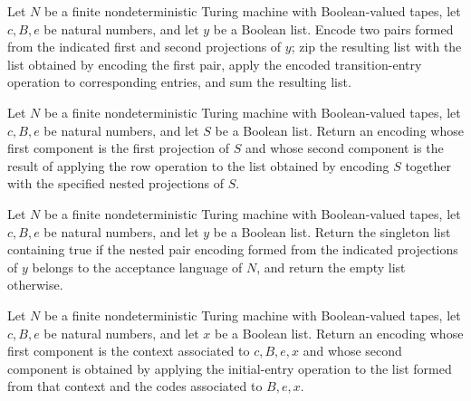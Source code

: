 \begin{definition}
\label{Randomized.BPLInP.rowW}
\leanok
{}
Let $N$ be a finite nondeterministic Turing machine with Boolean-valued tapes, let
$c,B,e$ be natural numbers, and let $y$ be a Boolean list. Encode two pairs formed from
the indicated first and second projections of $y$; zip the resulting list with the list
obtained by encoding the first pair, apply the encoded transition-entry operation to
corresponding entries, and sum the resulting list.
\end{definition}

\begin{definition}
\label{Randomized.BPLInP.dpStep}
\leanok
{}
Let $N$ be a finite nondeterministic Turing machine with Boolean-valued tapes, let
$c,B,e$ be natural numbers, and let $S$ be a Boolean list. Return an encoding whose
first component is the first projection of $S$ and whose second component is the result
of applying the row operation to the list obtained by encoding $S$ together with the
specified nested projections of $S$.
\end{definition}

\begin{definition}
\label{Randomized.BPLInP.initEntry}
\leanok
{}
Let $N$ be a finite nondeterministic Turing machine with Boolean-valued tapes, let
$c,B,e$ be natural numbers, and let $y$ be a Boolean list. Return the singleton list
containing true if the nested pair encoding formed from the indicated projections of $y$
belongs to the acceptance language of $N$, and return the empty list otherwise.
\end{definition}

\begin{definition}
\label{Randomized.BPLInP.dpInit}
\leanok
{}
Let $N$ be a finite nondeterministic Turing machine with Boolean-valued tapes, let
$c,B,e$ be natural numbers, and let $x$ be a Boolean list. Return an encoding whose
first component is the context associated to $c,B,e,x$ and whose second component is
obtained by applying the initial-entry operation to the list formed from that context
and the codes associated to $B,e,x$.
\end{definition}

